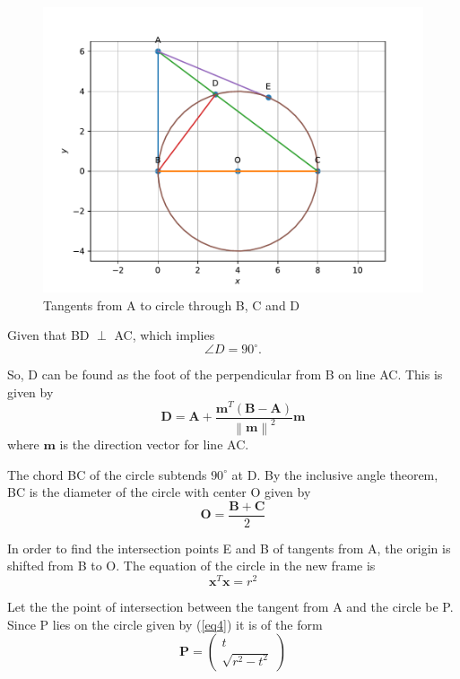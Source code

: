 \documentclass[journal,10pt,twocolumn]{article}
\providecommand{\norm}[1]{\left\lVert#1\right\rVert}
\let\vec\mathbf
\newcommand{\myvec}[1]{\ensuremath{\begin{pmatrix}#1\end{pmatrix}}}
\begin{document}
{\begin{figure}[H]
\centering
\includegraphics[width=1\columnwidth]{figs/fig1.pdf}
\caption{Tangents from A to circle through B, C and D}
\label{fig:triangle}
\end{figure}

Given that BD $\perp$ AC, which implies
\begin{equation}
\angle D = 90^\circ. 
\label{eq1}
\end{equation}

So, D can be found as the foot of the perpendicular from B on line AC. This is given by
\begin{equation}
\vec{D} = \vec{A} + \frac{\vec{m}^T(\vec{B-A})}{\norm{\vec{m}}^2}\vec{m} 
\label{eq2}
\end{equation}
where $\vec{m}$ is the direction vector for line AC.

The chord BC of the circle subtends $90^\circ$ at D. By the inclusive angle theorem, BC is the diameter of the circle with center O given by
\begin{equation}
\vec{O} = \frac{\vec{B}+\vec{C}}{2}
\label{eq3}
\end{equation}

In order to find the intersection points E and B of tangents from A, the origin is shifted from B to O. The equation of the circle in the new frame is
\begin{equation}
	\vec{x}^T\vec{x} = r^2
	\label{eq4}
\end{equation}

Let the the point of intersection between the tangent from A and the circle be P. Since P lies on the circle given by (\ref{eq4}) it is of the form    
\begin{equation}
	\vec{P} = \myvec{t \\ \sqrt{r^2-t^2}}
	\label{eq5}
\end{equation}

}
\end{document}
